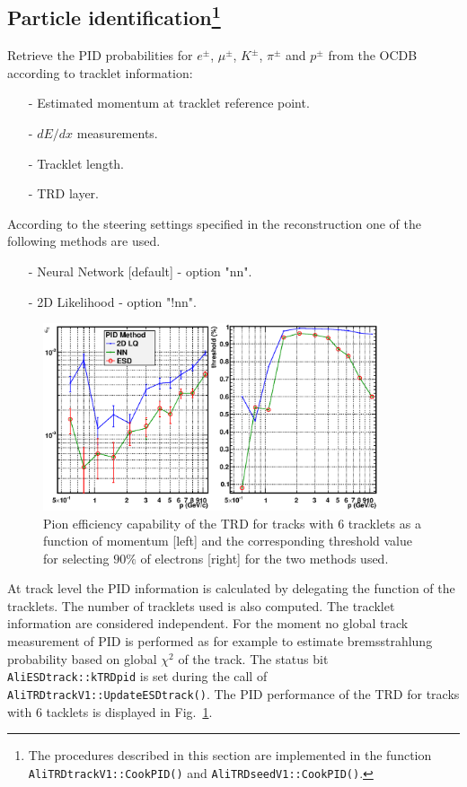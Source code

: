 \documentclass{alicetdr}
\begin{document}
\subsection[Tracklet PID]{Particle identification\footnote{The procedures described 
in this section are implemented in the function {\tt AliTRDtrackV1::CookPID()} and 
{\tt AliTRDseedV1::CookPID()}.}}\label{REC:Tracking:TrackletPID}

Retrieve the PID probabilities for $e^\pm$, $\mu^\pm$, $K^\pm$, $\pi^\pm$ and $p^\pm$ 
from the OCDB according to tracklet information:
\begin{itemize}
\item[-] Estimated momentum at tracklet reference point.
\item[-] $dE/dx$ measurements.
\item[-] Tracklet length.
\item[-] TRD layer.
\end{itemize}
According to the steering settings specified in the reconstruction one of the 
following methods are used.
\begin{itemize}
\item[-] Neural Network [default] - option "nn".
\item[-] 2D Likelihood - option "!nn".
\end{itemize}
\begin{figure}[htb]
\begin{center}
\includegraphics[width=0.88\textwidth, height=0.45\textwidth]{plots/trackPID.eps}
\end{center}
\caption{
Pion efficiency capability of the TRD for tracks with 6 tracklets as a function of 
momentum [left] and the corresponding threshold value for selecting $90\%$ of 
electrons [right] for the two methods used.}
\label{FIG_TRACK:PID}
\end{figure}

At track level the PID information is calculated by delegating the function of 
the tracklets. The number of tracklets used is also computed. The tracklet 
information are considered independent. For the moment no global track measurement 
of PID is performed as for example to estimate bremsstrahlung probability based on 
global $\chi^2$ of the track. The status bit {\tt AliESDtrack::kTRDpid} is set 
during the call of {\tt AliTRDtrackV1::UpdateESDtrack()}. The PID performance of 
the TRD for tracks with 6 tacklets is displayed in Fig.~\ref{FIG_TRACK:PID}. 
\\
\end{document}
